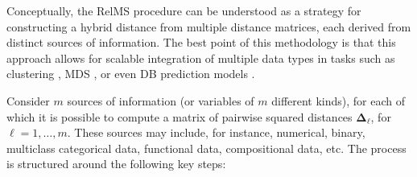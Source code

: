 Conceptually, the RelMS procedure can be understood as a strategy for constructing a hybrid distance from multiple distance matrices, each derived from distinct sources of information. The best point of this methodology is that this approach allows for scalable integration of multiple data types in tasks such as clustering \citep{grane2021robust,grane2021smart}, MDS \citep{albarran2015profile, Grane2026}, or even DB prediction models \citep{boj2010distance,boj2016global,boj2024robustification,dbstats}.

Consider $m$ sources of information (or variables of $m$ different kinds), for each of which it is possible to compute a matrix of pairwise squared distances $\mathbf{\Delta}_\ell$, for $\ell = 1,\dots, m$. These sources may include, for instance, numerical, binary, multiclass categorical data, functional data, compositional data, etc. The process is structured around the following key steps:

